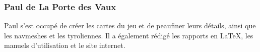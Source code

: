     \vspace{0.5cm}
    \subsubsection{Paul de La Porte des Vaux}

        Paul s'est occupé de créer les cartes du jeu et de peaufiner leurs détails, ainsi que les navmeshes et les tyroliennes. Il a également 
        rédigé les rapports en LaTeX, les manuels d'utilisation et le site internet.

    \vspace{0.5cm}